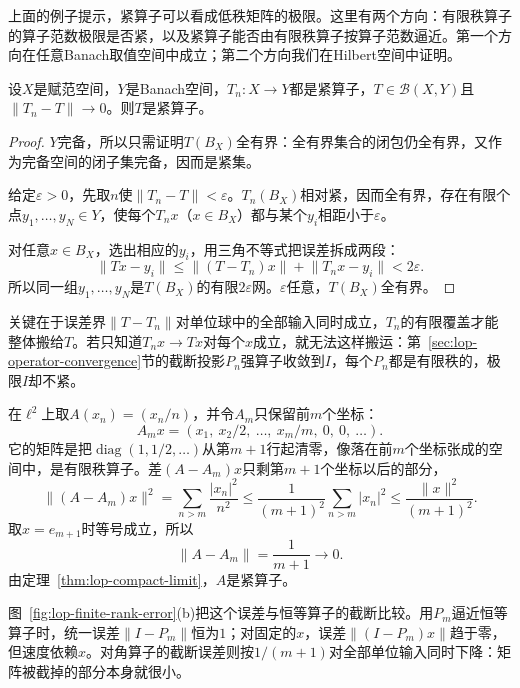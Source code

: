 上面的例子提示，紧算子可以看成低秩矩阵的极限。这里有两个方向：有限秩算子的算子范数极限是否紧，以及紧算子能否由有限秩算子按算子范数逼近。第一个方向在任意Banach取值空间中成立；第二个方向我们在Hilbert空间中证明。

\begin{theorem}[算子范数极限保持紧性]
\label{thm:lop-compact-limit}
设$X$是赋范空间，$Y$是Banach空间，$T_n:X\to Y$都是紧算子，$T\in\mathcal B(X,Y)$且$\lVert T_n-T\rVert\to0$。则$T$是紧算子。
\end{theorem}

\begin{proof}
$Y$完备，所以只需证明$T(B_X)$全有界：全有界集合的闭包仍全有界，又作为完备空间的闭子集完备，因而是紧集。

给定$\varepsilon>0$，先取$n$使$\lVert T_n-T\rVert<\varepsilon$。$T_n(B_X)$相对紧，因而全有界，存在有限个点$y_1,\ldots,y_N\in Y$，使每个$T_nx$（$x\in B_X$）都与某个$y_i$相距小于$\varepsilon$。

对任意$x\in B_X$，选出相应的$y_i$，用三角不等式把误差拆成两段：
\[
 \lVert Tx-y_i\rVert\leq\lVert(T-T_n)x\rVert+\lVert T_nx-y_i\rVert<2\varepsilon .
\]
所以同一组$y_1,\ldots,y_N$是$T(B_X)$的有限$2\varepsilon$网。$\varepsilon$任意，$T(B_X)$全有界。
\end{proof}

关键在于误差界$\lVert T-T_n\rVert$对单位球中的全部输入同时成立，$T_n$的有限覆盖才能整体搬给$T$。若只知道$T_nx\to Tx$对每个$x$成立，就无法这样搬运：第~\ref{sec:lop-operator-convergence}节的截断投影$P_n$强算子收敛到$I$，每个$P_n$都是有限秩的，极限$I$却不紧。

\begin{example}[对角算子的有限秩逼近]
\label{ex:lop-diagonal-finite-rank}
在$\ell^2$上取$A(x_n)=(x_n/n)$，并令$A_m$只保留前$m$个坐标：
\[
 A_mx=(x_1,\ x_2/2,\ \ldots,\ x_m/m,\ 0,\ 0,\ \ldots).
\]
它的矩阵是把$\operatorname{diag}(1,1/2,\ldots)$从第$m+1$行起清零，像落在前$m$个坐标张成的空间中，是有限秩算子。差$(A-A_m)x$只剩第$m+1$个坐标以后的部分，
\[
 \lVert(A-A_m)x\rVert^2=\sum_{n>m}\frac{\lvert x_n\rvert^2}{n^2}\leq\frac{1}{(m+1)^2}\sum_{n>m}\lvert x_n\rvert^2\leq\frac{\lVert x\rVert^2}{(m+1)^2}.
\]
取$x=e_{m+1}$时等号成立，所以
\[
 \lVert A-A_m\rVert=\frac1{m+1}\to0.
\]
由定理~\ref{thm:lop-compact-limit}，$A$是紧算子。
\end{example}

图~\ref{fig:lop-finite-rank-error}(b)把这个误差与恒等算子的截断比较。用$P_m$逼近恒等算子时，统一误差$\lVert I-P_m\rVert$恒为$1$；对固定的$x$，误差$\lVert(I-P_m)x\rVert$趋于零，但速度依赖$x$。对角算子的截断误差则按$1/(m+1)$对全部单位输入同时下降：矩阵被截掉的部分本身就很小。

